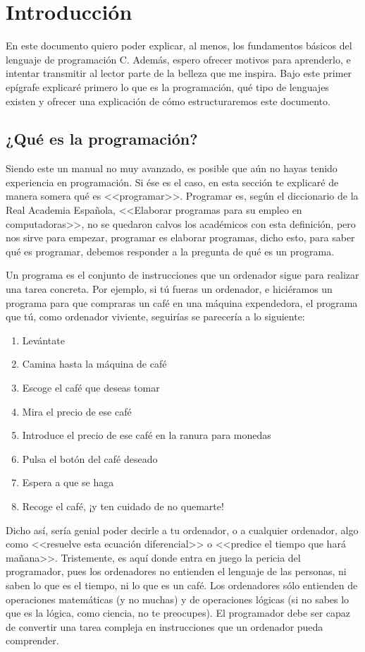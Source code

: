\documentclass[a4paper]{article}
\begin{document}
\section{Introducción}
En este documento quiero poder explicar, al menos, los fundamentos básicos
del lenguaje de programación C. Además, espero ofrecer motivos para aprenderlo,
e intentar transmitir al lector parte de la belleza que me inspira. Bajo este
primer epígrafe explicaré primero lo que es la programación, qué tipo de
lenguajes existen y ofrecer una explicación de cómo estructuraremos este
documento.

\label{section:queEsLaProgramacion}
\subsection{¿Qué es la programación?}
Siendo este un manual no muy avanzado, es posible que aún no hayas tenido
experiencia en programación. Si ése es el caso, en esta sección te explicaré
de manera somera qué es <<programar>>.
Programar es, según el diccionario de la Real Academia Española,
<<Elaborar programas para su empleo en computadoras>>, no se quedaron calvos
los académicos con esta definición, pero nos sirve para empezar,
programar es elaborar programas, dicho esto, para saber qué es programar,
debemos responder a la pregunta de qué es un programa.

Un programa es el conjunto de instrucciones que un ordenador sigue para
realizar una tarea concreta. Por ejemplo, si tú fueras un ordenador, e
hiciéramos un programa para que compraras un café en una máquina expendedora,
el programa que tú, como ordenador viviente, seguirías se parecería a lo
siguiente:
\begin{enumerate}
    \item Levántate
    \item Camina hasta la máquina de café
    \item Escoge el café que deseas tomar
    \item Mira el precio de ese café
    \item Introduce el precio de ese café en la ranura para monedas
    \item Pulsa el botón del café deseado
    \item Espera a que se haga
    \item Recoge el café, ¡y ten cuidado de no quemarte!
\end{enumerate}

Dicho así, sería genial poder decirle a tu ordenador, o a cualquier ordenador,
algo como <<resuelve esta ecuación diferencial>> o <<predice el tiempo que hará
mañana>>. Tristemente, es aquí donde entra en juego la pericia del programador,
pues los ordenadores no entienden el lenguaje de las personas, ni saben lo que
es el tiempo, ni lo que es un café. Los ordenadores sólo entienden de
operaciones matemáticas (y no muchas) y de operaciones lógicas (si no sabes lo
que es la lógica, como ciencia, no te preocupes). El programador debe ser capaz
de convertir una tarea compleja en instrucciones que un ordenador pueda
comprender.
\end{document}
